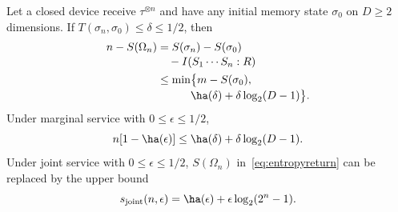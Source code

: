 \begin{theorem}\label{thm:entropy}
Let a closed device receive $\tau^{\otimes n}$ and have any initial memory state $\sigma_0$ on $D\ge2$ dimensions. If $T(\sigma_n,\sigma_0)\le\delta\le1/2$, then
\begin{equation}
 \begin{aligned}
 n-S(\Omega_n)
 &= S(\sigma_n)-S(\sigma_0)\\[-2pt]
 &\quad-I(S_1\cdots S_n:R)\\
 &\le\min\bigl\{m-S(\sigma_0),\\[-2pt]
 &\qquad\quad\ha(\delta)+\delta\log_2(D-1)\bigr\}.
 \end{aligned}
 \label{eq:entropyreturn}
\end{equation}
Under marginal service with $0\le\epsilon\le1/2$,
\begin{equation}
 n[1-\ha(\epsilon)]\le\ha(\delta)+\delta\log_2(D-1).
 \label{eq:reverse-marg-lb}
\end{equation}
Under joint service with $0\le\epsilon\le1/2$, $S(\Omega_n)$ in~\eqref{eq:entropyreturn} can be replaced by the upper bound
\begin{equation}
 s_{\rm joint}(n,\epsilon)=\ha(\epsilon)+\epsilon\log_2(2^n-1).
 \label{eq:sjoint}
\end{equation}
\end{theorem}
